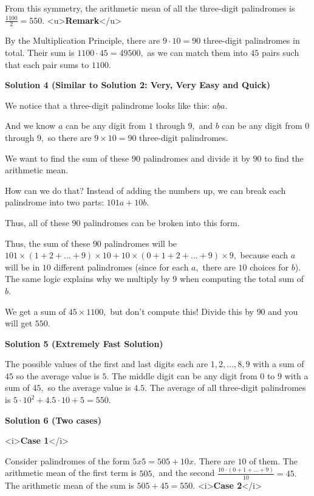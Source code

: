 \begin{enumerate}
 From this symmetry, the arithmetic mean of all the three-digit palindromes is $\frac{1100}{2}=\boxed{550}.$
<u>\textbf{Remark}</u>

 By the Multiplication Principle, there are $9\cdot10=90$ three-digit palindromes in total. Their sum is $1100\cdot45=49500,$ as we can match them into $45$ pairs such that each pair sums to $1100.$




\textbf{Solution 4 (Similar to Solution 2: Very, Very Easy and Quick)}

We notice that a three-digit palindrome looks like this: $\underline{aba}.$

 And we know $a$ can be any digit from $1$ through $9,$ and $b$ can be any digit from $0$ through $9,$ so there are $9\times{10}=90$ three-digit palindromes.

 We want to find the sum of these $90$ palindromes and divide it by $90$ to find the arithmetic mean.

 How can we do that? Instead of adding the numbers up, we can break each palindrome into two parts: $101a+10b.$

 Thus, all of these $90$ palindromes can be broken into this form.

 Thus, the sum of these $90$ palindromes will be $101\times{(1+2+...+9)}\times{10}+10\times{(0+1+2+...+9)}\times{9},$ because each $a$ will be in $10$ different palindromes (since for each $a,$ there are $10$ choices for $b$). The same logic explains why we multiply by $9$ when computing the total sum of $b.$

 We get a sum of $45\times{1100},$ but don't compute this! Divide this by $90$ and you will get $\boxed{550}.$




\textbf{Solution 5 (Extremely Fast Solution)}

The possible values of the first and last digits each are $1, 2, ..., 8, 9$ with a sum of $45$ so the average value is $5.$ The middle digit can be any digit from $0$ to $9$ with a sum of $45,$ so the average value is $4.5.$ The average of all three-digit palindromes is $5\cdot 10^2+4.5\cdot 10+5=\boxed{550}.$




\textbf{Solution 6 (Two cases)}

<i>\textbf{Case 1}</i>

 Consider palindromes of the form $5x5 = 505 + 10x.$ There are $10$ of them. The arithmetic mean of the first term is $505,$ and the second $\frac {10 \cdot(0 + 1 + ... + 9)}{10} = 45.$The arithmetic mean of the sum is $505 + 45 = 550.$
<i>\textbf{Case 2}</i>


\end{enumerate}
